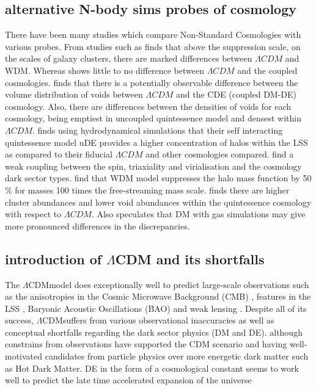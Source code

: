 \documentclass[a4paper,fleqn,usenatbib]{mnras}
\def \lcdm{$\Lambda$CDM}
\begin{document}
\subsection{alternative N-body sims probes of cosmology}
There have been many studies which compare Non-Standard Cosmologies with various probes. From studies such as \citet{Elahi_14} finds that above the suppression scale, on the scales of galaxy clusters, there are marked differences between $\Lambda CDM$ and WDM. Whereas \citet{Elahi_15} shows little to no difference between $\Lambda CDM$ and the coupled cosmologies. \citet{Adermann_17} finds that there is a potentially observable difference between the volume distribution of voids between $\Lambda CDM$ and the CDE (coupled DM-DE) cosmology. Also, there are differences between the densities of voids for each cosmology, being emptiest in uncoupled quintessence model and densest within $\Lambda CDM$. \citet{Carlesi_14a} finds using hydrodynamical simulations that their  self interacting quintessence model uDE provides a higher concentration of halos within the LSS as compared to their fiducial $\Lambda CDM$ and other cosmologies compared. \citet{Carlesi_14b} find a weak coupling between the spin, triaxiality and virialisation and the cosmology dark sector types. \citet{Smith_11} find that WDM model suppresses the halo mass function by 50$\%$ for masses 100 times the free-streaming mass scale. \citet{Watts_17} finds there are higher cluster abundances and lower void abundances within the quintessence cosmology with respect to $\Lambda CDM$. Also speculates that DM with gas simulations may give more pronounced differences in the discrepancies.

\subsection{introduction of $\Lambda$CDM and its shortfalls}

The \lcdm model does exceptionally well to predict large-scale observations such as the anisotropies in the Cosmic Microwave Background (CMB) \citep{Bennett_13,Plank_14b,Plank_16}, features in the LSS \citep{Abazajian_09}, Baryonic Acoustic Oscillations (BAO) \citep{Beutler_11} and weak lensing \citep{Kilbinger_13}.
Despite all of its success, \lcdm suffers from various observational inaccuracies as well as conceptual shortfalls regarding the dark sector physics (DM and DE). although constrains from observations have supported the CDM scenario \citep{Bertone_05,Petraki_13} and having well-motivated candidates from particle physics over more energetic dark matter such as Hot Dark Matter. DE in the form of a cosmological constant seems to work well to predict the late time accelerated expansion of the universe \citep{Suzuki_12}
\end{document}
